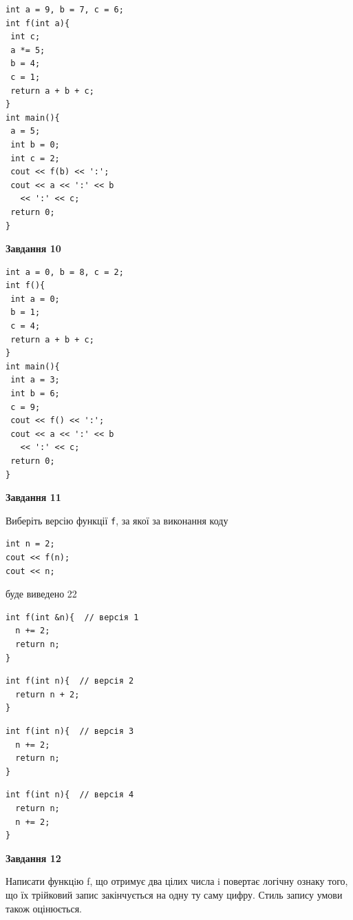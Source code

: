 \documentclass[12pt, ukrainian]{article}
\def\code#1{\Verb!#1!}
\begin{document}
{\begin {large}
\begin{minipage}[t]{7.0cm}
\begin{verbatim}
int a = 9, b = 7, c = 6;
int f(int a){
 int c;
 a *= 5;
 b = 4;
 c = 1;
 return a + b + c;
}
int main(){
 a = 5;
 int b = 0;
 int c = 2;
 cout << f(b) << ':';
 cout << a << ':' << b 
   << ':' << c;
 return 0;
}
\end{verbatim}



\begin{center}
\textbf{Завдання 10}
\end{center}
\vspace{-8mm}

\begin{verbatim}
int a = 0, b = 8, c = 2;
int f(){
 int a = 0;
 b = 1;
 c = 4;
 return a + b + c;
}
int main(){
 int a = 3;
 int b = 6;
 c = 9;
 cout << f() << ':';
 cout << a << ':' << b 
   << ':' << c;
 return 0;
}
\end{verbatim}

\end{minipage}
\vline \hspace{1mm}
\begin{minipage}[t]{11.0cm}

\begin{center}
\textbf{Завдання 11}
\end{center}
Виберіть версію функції \code{f}, за якої за виконання коду
\begin{verbatim}
int n = 2;
cout << f(n);
cout << n;
\end{verbatim}

буде виведено 22

\begin{verbatim}
int f(int &n){  // версія 1
  n += 2;
  return n;
}
\end{verbatim}

\vspace{-8mm}\begin{verbatim}
int f(int n){  // версія 2
  return n + 2;
}
\end{verbatim}

\vspace{-8mm}\begin{verbatim}
int f(int n){  // версія 3
  n += 2;
  return n;
}
\end{verbatim}

\vspace{-8mm}\begin{verbatim}
int f(int n){  // версія 4
  return n;
  n += 2;
}
\end{verbatim}



\begin{center}
\textbf{Завдання 12}
\end{center}

Написати функцiю f, що отримує два цілих числа i повертає логічну ознаку того, що їх трійковий запис закінчується на одну ту саму цифру. Стиль запису умови також оцінюється.\par

\end{minipage}

\end {large}}
\newpage
\end{document}
